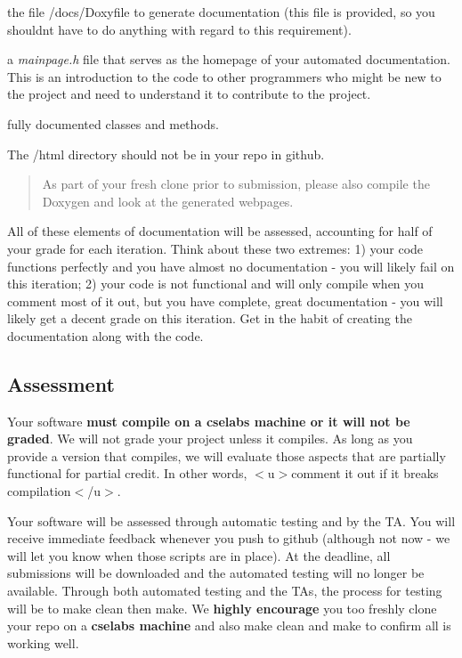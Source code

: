 \begin{DoxyItemize}
\item the file {\ttfamily /docs/\+Doxyfile} to generate documentation (this file is provided, so you shouldn\textquotesingle{}t have to do anything with regard to this requirement).
\item a {\itshape mainpage.\+h} file that serves as the homepage of your automated documentation. This is an introduction to the code to other programmers who might be new to the project and need to understand it to contribute to the project.
\item fully documented classes and methods.
\item The /html directory should not be in your repo in github.
\end{DoxyItemize}

\begin{quote}
As part of your fresh clone prior to submission, please also compile the Doxygen and look at the generated webpages. \end{quote}


All of these elements of documentation will be assessed, accounting for half of your grade for each iteration. Think about these two extremes\+: 1) your code functions perfectly and you have almost no documentation -\/ you will likely fail on this iteration; 2) your code is not functional and will only compile when you comment most of it out, but you have complete, great documentation -\/ you will likely get a decent grade on this iteration. Get in the habit of creating the documentation along with the code.





\subsection*{Assessment}

Your software {\bfseries must compile on a cselabs machine or it will not be graded}. We will not grade your project unless it compiles. As long as you provide a version that compiles, we will evaluate those aspects that are partially functional for partial credit. In other words, $<$u$>$comment it out if it breaks compilation$<$/u$>$.

Your software will be assessed through automatic testing and by the TA. You will receive immediate feedback whenever you push to github (although not now -\/ we will let you know when those scripts are in place). At the deadline, all submissions will be downloaded and the automated testing will no longer be available. Through both automated testing and the T\+As, the process for testing will be to {\ttfamily make clean} then {\ttfamily make}. We {\bfseries highly encourage} you too freshly clone your repo on a {\bfseries cselabs machine} and also {\ttfamily make clean} and {\ttfamily make} to confirm all is working well.


